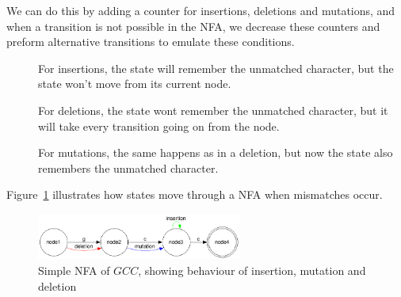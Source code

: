 We can do this by adding a counter for insertions, deletions and mutations, and when a transition is not possible in the NFA, we decrease these counters and preform alternative transitions to emulate these conditions.
\begin{description}
\item[] For insertions, the state will remember the unmatched character, but the state won't move from its current node.
\item[]For deletions, the state wont remember the unmatched character, but it will take every transition going on from the node.
\item[] For mutations, the same happens as in a deletion, but now the state also remembers the unmatched character.
\end{description}
Figure~\ref{fig:ins_mut_del} illustrates how states move through a NFA when mismatches occur. 

\begin{figure}[h!]
  \centering
      \includegraphics[width=0.6\textwidth]{lib/gcc_ins_mut_del.png}
  \caption{Simple NFA of $GCC$, showing behaviour of insertion, mutation and deletion}
\label{fig:ins_mut_del}
\end{figure}


